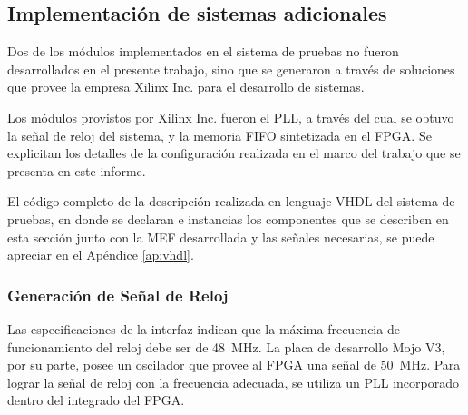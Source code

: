 %		
%
\subsection{Implementación de sistemas adicionales}
Dos de los módulos implementados en el sistema de pruebas no fueron desarrollados en el presente trabajo, sino que se generaron a través de soluciones que provee la empresa Xilinx Inc. para el desarrollo de sistemas.

Los módulos provistos por Xilinx Inc. fueron el PLL, a través del cual se obtuvo la señal de reloj del sistema, y la memoria FIFO sintetizada en el FPGA. Se explicitan los detalles de la configuración realizada en el marco del trabajo que se presenta en este informe. 

El código completo de la descripción realizada en lenguaje VHDL del sistema de pruebas, en donde se declaran e instancias los componentes que se describen en esta sección junto con la MEF desarrollada y las señales necesarias, se puede apreciar en el Apéndice \ref{ap:vhdl}.

	\subsubsection{Generación de Señal de Reloj}
		Las especificaciones de la interfaz indican que la máxima frecuencia de funcionamiento del reloj debe ser de \SI{48}{\mega\hertz}\cite{Cypress2017}. La placa de desarrollo Mojo V3, por su parte, posee un oscilador que provee al FPGA una señal de \SI{50}{\mega\hertz}. Para lograr la señal de reloj con la frecuencia adecuada, se utiliza un PLL incorporado dentro del integrado del FPGA. 
		
